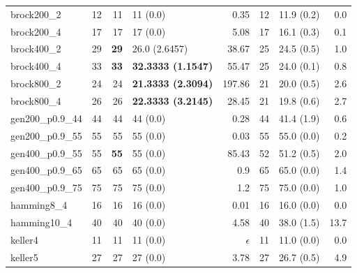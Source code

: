 \documentclass[conference]{IEEEtran}
\begin{document}
\begin{center}
\begin{table}[ht]
{\begin{tabular}{lr|rlr|rlr}
 brock200\_2       &           12  &           11  &  11 (0.0)                   &         0.35  &    12  &  11.9 (0.2)     &         0.0  \\
 brock200\_4       &           17  &           17  &  17 (0.0)                   &         5.08  &    17  &  16.1 (0.3)     &         0.1  \\
 brock400\_2       &           29  &  \textbf{29}  &  26.0 (2.6457)              &        38.67  &    25  &  24.5 (0.5)     &         1.0  \\
 brock400\_4       &           33  &  \textbf{33}  &  \textbf{32.3333 (1.1547)}  &        55.47  &    25  &  24.0 (0.1)     &         0.8  \\
 brock800\_2       &           24  &           24  &  \textbf{21.3333 (2.3094)}  &       197.86  &    21  &  20.0 (0.5)     &         2.6  \\
 brock800\_4       &           26  &           26  &  \textbf{22.3333 (3.2145)}  &        28.45  &    21  &  19.8 (0.6)     &         2.7  \\
 gen200\_p0.9\_44  &           44  &           44  &  44 (0.0)                   &         0.28  &    44  &  41.4 (1.9)     &         0.6  \\
 gen200\_p0.9\_55  &           55  &           55  &  55 (0.0)                   &         0.03  &    55  &  55.0 (0.0)     &         0.2  \\
 gen400\_p0.9\_55  &           55  &  \textbf{55}  &  55 (0.0)                   &        85.43  &    52  &  51.2 (0.5)     &         2.0  \\
 gen400\_p0.9\_65  &           65  &           65  &  65 (0.0)                   &          0.9  &    65  &  65.0 (0.0)     &         1.4  \\
 gen400\_p0.9\_75  &           75  &           75  &  75 (0.0)                   &          1.2  &    75  &  75.0 (0.0)     &         1.0  \\
 hamming8\_4       &           16  &           16  &  16 (0.0)                   &         0.01  &    16  &  16.0 (0.0)     &         0.0  \\
 hamming10\_4      &           40  &           40  &  40 (0.0)                   &         4.58  &    40  &  38.0 (1.5)     &        13.7  \\
 keller4           &           11  &           11  &  11 (0.0)                   &   $\epsilon$  &    11  &  11.0 (0.0)     &         0.0  \\
 keller5           &           27  &           27  &  27 (0.0)                   &         3.78  &    27  &  26.7 (0.5)     &         4.9  \\

\end{tabular}}
\end{table}
\end{center}
\end{document}
